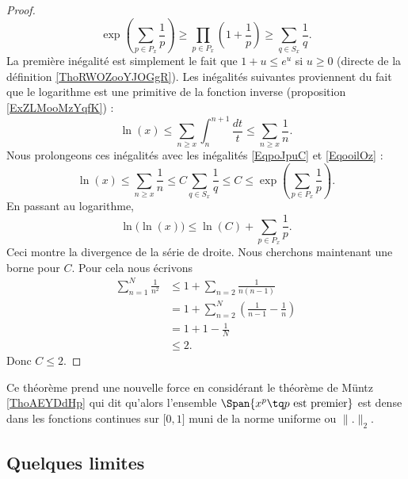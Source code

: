 \begin{proof}
\begin{equation}
        \exp\left( \sum_{p\in P_x}\frac{1}{ p } \right)\geq\prod_{p\in P_x}\left( 1+\frac{1}{ p } \right)\geq \sum_{q\in S_x}\frac{1}{ q }.
    \end{equation}
    La première inégalité est simplement le fait que \( 1+u\leq e^u\) si \( u\geq 0\) (directe de la définition \ref{ThoRWOZooYJOGgR}). Les inégalités suivantes proviennent du fait que le logarithme est une primitive de la fonction inverse (proposition \ref{ExZLMooMzYqfK}) :
    \begin{equation}
        \ln(x)\leq \sum_{n\geq x}\int_{n}^{n+1}\frac{dt}{ t }\leq \sum_{n\geq x}\frac{1}{ n }.
    \end{equation}
    Nous prolongeons ces inégalités avec les inégalités \eqref{EqpoJpuC} et \eqref{EqooilOz} :
    \begin{equation}
        \ln(x)\leq \sum_{n\geq x}\frac{1}{ n }\leq C\sum_{q\in S_x}\frac{1}{ q }\leq C\leq \exp\left( \sum_{p\in P_x}\frac{1}{ p } \right).
    \end{equation}
    En passant au logarithme,
    \begin{equation}
        \ln\big( \ln(x) \big)\leq\ln(C)+\sum_{p\in P_x}\frac{1}{ p }.
    \end{equation}
    Ceci montre la divergence de la série de droite. Nous cherchons maintenant une borne pour \( C\). Pour cela nous écrivons
    \begin{subequations}
        \begin{align}
            \sum_{n=1}^N\frac{1}{ n^2 }&\leq 1+\sum_{n=2}\frac{1}{ n(n-1) }\\
            &=1+\sum_{n=2}^N\left( \frac{1}{ n-1 }-\frac{1}{ n } \right)\\
            &=1+1-\frac{1}{ N }\\
            &\leq 2.
        \end{align}
    \end{subequations}
    Donc \( C\leq 2\).
\end{proof}
Ce théorème prend une nouvelle force en considérant le théorème de Müntz \ref{ThoAEYDdHp} qui dit qu'alors l'ensemble \( \Span\{ x^p\tq  p\text{ est premier} \}\) est dense dans les fonctions continues sur \( \mathopen[ 0 , 1 \mathclose]\) muni de la norme uniforme ou \( \| . \|_2\).

\subsection{Quelques limites}

